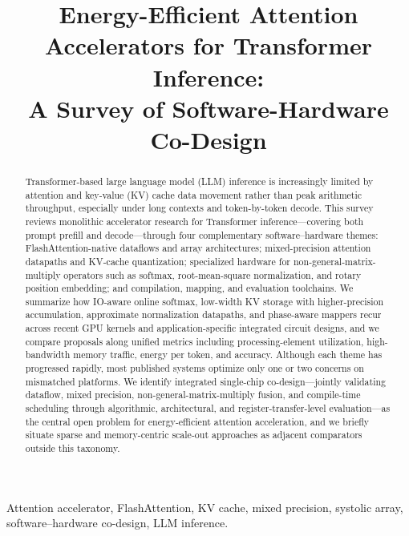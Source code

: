\documentclass[conference]{IEEEtran}
\begin{document}
\title{Energy-Efficient Attention Accelerators for Transformer Inference: \\
A Survey of Software-Hardware Co-Design}

\author{
}

\maketitle

\begin{abstract}
Transformer-based large language model (LLM) inference is increasingly limited by attention and key-value (KV) cache data movement rather than peak arithmetic throughput, especially under long contexts and token-by-token decode.
This survey reviews monolithic accelerator research for Transformer inference---covering both prompt prefill and decode---through four complementary software--hardware themes: FlashAttention-native dataflows and array architectures; mixed-precision attention datapaths and KV-cache quantization; specialized hardware for non-general-matrix-multiply operators such as softmax, root-mean-square normalization, and rotary position embedding; and compilation, mapping, and evaluation toolchains.
We summarize how IO-aware online softmax, low-width KV storage with higher-precision accumulation, approximate normalization datapaths, and phase-aware mappers recur across recent GPU kernels and application-specific integrated circuit designs, and we compare proposals along unified metrics including processing-element utilization, high-bandwidth memory traffic, energy per token, and accuracy.
Although each theme has progressed rapidly, most published systems optimize only one or two concerns on mismatched platforms.
We identify integrated single-chip co-design---jointly validating dataflow, mixed precision, non-general-matrix-multiply fusion, and compile-time scheduling through algorithmic, architectural, and register-transfer-level evaluation---as the central open problem for energy-efficient attention acceleration, and we briefly situate sparse and memory-centric scale-out approaches as adjacent comparators outside this taxonomy.
\end{abstract}

\begin{IEEEkeywords}
Attention accelerator, FlashAttention, KV cache, mixed precision, systolic array, software--hardware co-design, LLM inference.
\end{IEEEkeywords}
\end{document}
